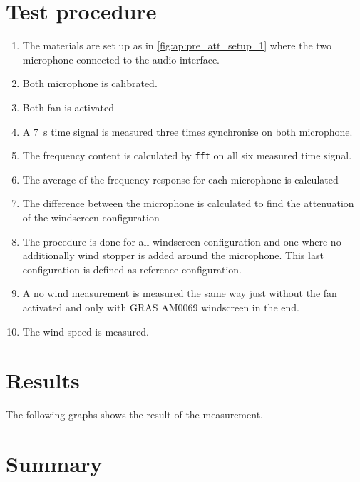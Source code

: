 \section*{Test procedure}


\begin{enumerate}
\item The materials are set up as in \autoref{fig:ap:pre_att_setup_1} where the two microphone connected to the audio interface.
\item Both microphone is calibrated.
\item Both fan is activated 
\item A \SI{7}{\second} time signal is measured three times synchronise on both microphone.
\item The frequency content is calculated by \texttt{fft} on all six measured time signal.
\item The average of the frequency response for each microphone is calculated
\item The difference between the microphone is calculated to find the attenuation of the windscreen configuration
\item The procedure is done for all windscreen configuration and one where no additionally wind stopper is added around the microphone. This last configuration is defined as reference configuration.
\item A no wind measurement is measured the same way just without the fan activated and only with GRAS AM0069 windscreen in the end.
\item The wind speed is measured.
\end{enumerate}

\section*{Results}

The following graphs shows the result of the measurement.









\section*{Summary}

